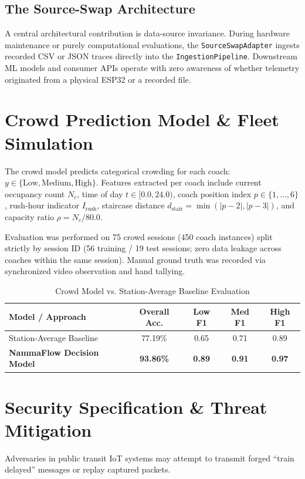 \documentclass[conference]{IEEEtran}
\begin{document}
\subsection{The Source-Swap Architecture}
A central architectural contribution is data-source invariance. During hardware maintenance or purely computational evaluations, the \texttt{SourceSwapAdapter} ingests recorded CSV or JSON traces directly into the \texttt{IngestionPipeline}. Downstream ML models and consumer APIs operate with zero awareness of whether telemetry originated from a physical ESP32 or a recorded file.

\section{Crowd Prediction Model \& Fleet Simulation}
The crowd model predicts categorical crowding for each coach: $y \in \{\text{Low}, \text{Medium}, \text{High}\}$.
Features extracted per coach include current occupancy count $N_c$, time of day $t \in [0.0, 24.0)$, coach position index $p \in \{1, \dots, 6\}$, rush-hour indicator $I_{\text{rush}}$, staircase distance $d_{\text{stair}} = \min(|p - 2|, |p - 3|)$, and capacity ratio $\rho = N_c / 80.0$.

Evaluation was performed on 75 crowd sessions (450 coach instances) split strictly by session ID (56 training / 19 test sessions; zero data leakage across coaches within the same session). Manual ground truth was recorded via synchronized video observation and hand tallying.

\begin{table}[htbp]
\caption{Crowd Model vs. Station-Average Baseline Evaluation}
\begin{center}
\begin{tabular}{lcccc}
\toprule
\textbf{Model / Approach} & \textbf{Overall Acc.} & \textbf{Low F1} & \textbf{Med F1} & \textbf{High F1} \\
\midrule
Station-Average Baseline & 77.19\% & 0.65 & 0.71 & 0.89 \\
\textbf{NammaFlow Decision Model} & \textbf{93.86\%} & \textbf{0.89} & \textbf{0.91} & \textbf{0.97} \\
\bottomrule
\end{tabular}
\label{tab:crowd_results}
\end{center}
\end{table}

\section{Security Specification \& Threat Mitigation}
Adversaries in public transit IoT systems may attempt to transmit forged ``train delayed'' messages or replay captured packets.
\end{document}
